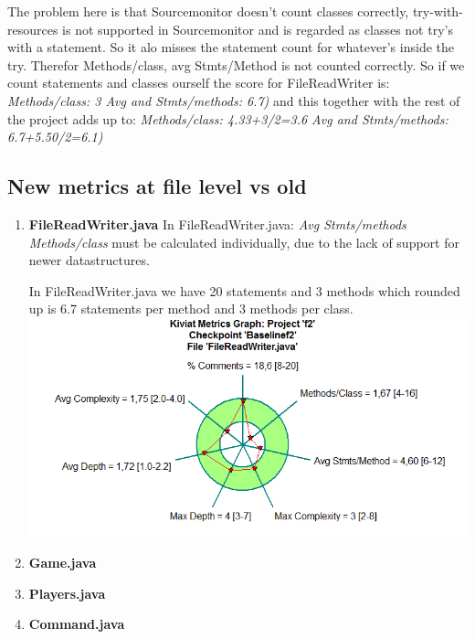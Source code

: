 \documentclass{article}
\begin{document}
The problem here is that Sourcemonitor doesn't count classes correctly, try-with-resources is not supported in Sourcemonitor and is regarded as classes not try's with a statement. So it alo misses the statement count for whatever's inside the try. Therefor Methods/class, avg Stmts/Method is not counted correctly. So if we count statements and classes ourself the score for FileReadWriter is:
\textit{Methods/class: 3 Avg and Stmts/methods: 6.7)} and this together with the rest of the project adds up to: \textit{Methods/class: 4.33+3/2=3.6 Avg and Stmts/methods: 6.7+5.50/2=6.1)}

\subsection{New metrics at file level vs old} %
\begin{enumerate}
\item
\textbf{FileReadWriter.java}
In FileReadWriter.java:\newline
\textit{Avg Stmts/methods Methods/class} must be calculated individually, due to the lack
of support for newer datastructures.

In FileReadWriter.java we have 20 statements and 3 methods which 
rounded up is 6.7 statements per method and 3 methods per class.\newline
\includegraphics[scale=0.5]{Kiviat-filereadwriter-after.png}\newline

\item
\textbf{Game.java}

\item
\textbf{Players.java} %


\item%
\textbf{Command.java}

\end{enumerate}
\end{document}
